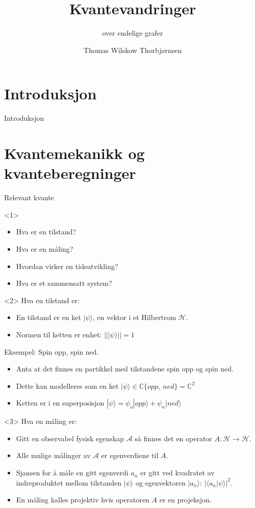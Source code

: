 \documentclass[norsk]{beamer}
\author{Thomas Wilskow Thorbjørnsen}
\title{Kvantevandringer}
\subtitle{over endelige grafer}
\begin{document}
\section{Introduksjon}

	\begin{frame}{Introduksjon}
		\tableofcontents
	\end{frame}

\section{Kvantemekanikk og kvanteberegninger}

	\begin{frame}{Relevant kvante}

		\begin{onlyenv}<1>
			\begin{itemize}
				\item Hva er en tilstand?
				\item Hva er en måling?
				\item Hvordan virker en tidsutvikling?
				\item Hva er et sammensatt system?
			\end{itemize}
		\end{onlyenv}

		\begin{onlyenv}<2>
			Hva en tilstand er:
			\begin{itemize}
				\item En tilstand er en ket $|\psi\rangle$, en vektor i et Hilbertrom $\mathcal{H}$.
				\item Normen til ketten er enhet: $|||\psi\rangle||=1$ 
			\end{itemize}

			Eksempel: Spin opp, spin ned.
			\begin{itemize}
				\item Anta at det finnes en partikkel med tilstandene spin opp og spin ned.
				\item Dette kan modelleres som en ket $|\psi\rangle\in \mathbb{C}\{opp,\ ned\} = \mathbb{C}^2$
				\item Ketten er i en superposisjon $|\psi\rangle = \psi_o|opp\rangle + \psi_n|ned\rangle$
			\end{itemize}
		\end{onlyenv}

		\begin{onlyenv}<3>
			Hva en måling er:
			\begin{itemize}
				\item Gitt en observabel fysisk egenskap $\mathcal{A}$ så finnes det en operator $A:\mathcal{H}\rightarrow\mathcal{H}$.
				\item Alle mulige målinger av $\mathcal{A}$ er egenverdiene til $A$.
				\item Sjansen for å måle en gitt egenverdi $a_n$ er gitt ved kvadratet av indreproduktet mellom tilstanden $|\psi\rangle$ og egenvektoren $|a_n\rangle$: $|\langle a_n|\psi\rangle|^2$.
				\item En måling kalles projektiv hvis operatoren $A$ er en projeksjon.
			\end{itemize}
		\end{onlyenv}


\end{frame}
\end{document}
